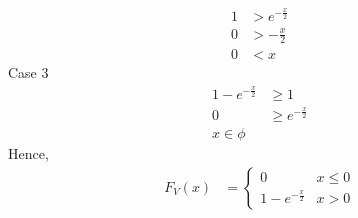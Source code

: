 \documentclass[journal,12pt,twocolumn]{IEEEtran}
\renewcommand\thesection{\arabic{section}}
\begin{document}
\begin{enumerate}[label=\thesection.\arabic*
,ref=\thesection.\theenumi]
\begin{align}
    1 &> e^{-\frac{x}{2}}\\
    0 &> -\frac{x}{2}\\
    0 &< x
\end{align}
Case 3
\begin{align}
    1-e^{-\frac{x}{2}} &\ge 1\\
    0 &\ge e^{-\frac{x}{2}}\\
    x \in \phi
\end{align}
Hence,
\begin{align}
    F_V(x) &= \begin{cases}
                0 & x\le0\\
                1 - e^{-\frac{x}{2}} & x>0
    \end{cases}
\end{align}
\end{enumerate}
\end{document}
